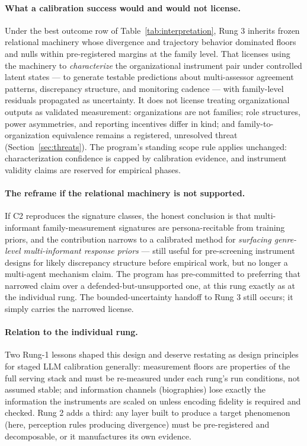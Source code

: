 \documentclass[12pt, letterpaper]{article}
\begin{document}
\paragraph{What a calibration success would and would not license.} Under the best outcome row of Table~\ref{tab:interpretation}, Rung 3 inherits frozen relational machinery whose divergence and trajectory behavior dominated floors and nulls within pre-registered margins at the family level. That licenses using the machinery to \emph{characterize} the organizational instrument pair under controlled latent states --- to generate testable predictions about multi-assessor agreement patterns, discrepancy structure, and monitoring cadence --- with family-level residuals propagated as uncertainty. It does not license treating organizational outputs as validated measurement: organizations are not families; role structures, power asymmetries, and reporting incentives differ in kind; and family-to-organization equivalence remains a registered, unresolved threat (Section~\ref{sec:threats}). The program's standing scope rule applies unchanged: characterization confidence is capped by calibration evidence, and instrument validity claims are reserved for empirical phases.

\paragraph{The reframe if the relational machinery is not supported.} If C2 reproduces the signature classes, the honest conclusion is that multi-informant family-measurement signatures are persona-recitable from training priors, and the contribution narrows to a calibrated method for \emph{surfacing genre-level multi-informant response priors} --- still useful for pre-screening instrument designs for likely discrepancy structure before empirical work, but no longer a multi-agent mechanism claim. The program has pre-committed to preferring that narrowed claim over a defended-but-unsupported one, at this rung exactly as at the individual rung. The bounded-uncertainty handoff to Rung 3 still occurs; it simply carries the narrowed license.

\paragraph{Relation to the individual rung.} Two Rung-1 lessons shaped this design and deserve restating as design principles for staged LLM calibration generally: measurement floors are properties of the full serving stack and must be re-measured under each rung's run conditions, not assumed stable; and information channels (biographies) lose exactly the information the instruments are scaled on unless encoding fidelity is required and checked. Rung 2 adds a third: any layer built to produce a target phenomenon (here, perception rules producing divergence) must be pre-registered and decomposable, or it manufactures its own evidence.
\end{document}
